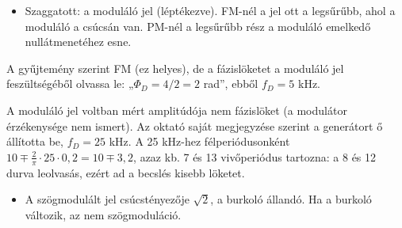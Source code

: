 \begin{rajz}
\begin{center}
\begin{tikzpicture}[x=0.01985cm,y=-0.01985cm,line cap=round,line join=round]
\end{tikzpicture}\end{center}
\begin{itemize}
\item Szaggatott: a moduláló jel (léptékezve). FM-nél a jel ott a legsűrűbb, ahol a moduláló a csúcsán van. PM-nél a legsűrűbb rész a moduláló emelkedő nullátmenetéhez esne.
\end{itemize}
\end{rajz}
\begin{tipp}
A gyűjtemény szerint FM (ez helyes), de a fázislöketet a moduláló jel feszültségéből olvassa le: „$\Phi_D=4/2=2$ rad”, ebből $f_D=5$ kHz.
\end{tipp}
\begin{figyelem}[Javítás]
A moduláló jel voltban mért amplitúdója nem fázislöket (a modulátor érzékenysége nem ismert). Az oktató saját megjegyzése szerint a generátort ő állította be, $f_D=25$ kHz. A 25 kHz-hez félperiódusonként $10\mp\tfrac2\pi\cdot25\cdot0{,}2=10\mp3{,}2$, azaz kb. 7 és 13 vivőperiódus tartozna: a 8 és 12 durva leolvasás, ezért ad a becslés kisebb löketet.
\end{figyelem}
\begin{eredmeny}

\begin{center}\end{center}
\end{eredmeny}
\begin{figyelem}
\begin{itemize}
\item A szögmodulált jel csúcstényezője $\sqrt2$, a burkoló állandó. Ha a burkoló változik, az nem szögmoduláció.
\end{itemize}
\end{figyelem}


